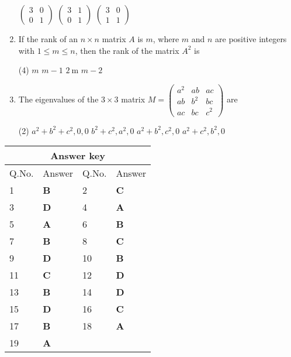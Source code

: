 \begin{enumerate}[label=\color{ocre}\textbf{\arabic*.}]
\begin{tasks}
		\task[\textbf{B.}] $\left(\begin{array}{ll}3 & 0 \\ 0 & 1\end{array}\right)$
		\task[\textbf{C.}] $\left(\begin{array}{ll}3 & 1 \\ 0 & 1\end{array}\right)$
		\task[\textbf{D.}] $\left(\begin{array}{ll}3 & 0 \\ 1 & 1\end{array}\right)$
	\end{tasks}
	\item  If the rank of an $n \times n$ matrix $A$ is $m$, where $m$ and $n$ are positive integers with $1 \leq m \leq n$, then the rank of the matrix $A^{2}$ is
	{}
	\begin{tasks}(4)
		\task[\textbf{A.}]  $m$
		\task[\textbf{B.}] $m-1$
		\task[\textbf{C.}] $2 \mathrm{~m}$
		\task[\textbf{D.}] $m-2$
	\end{tasks}
	\item   The eigenvalues of the $3 \times 3$ matrix $M=\left(\begin{array}{lll}a^{2} & a b & a c \\ a b & b^{2} & b c \\ a c & b c & c^{2}\end{array}\right)$ are
	{}
	\begin{tasks}(2)
		\task[\textbf{A.}] $a^{2}+b^{2}+c^{2}, 0,0$
		\task[\textbf{B.}] $b^{2}+c^{2}, a^{2}, 0$
		\task[\textbf{C.}] $a^{2}+b^{2}, c^{2}, 0$
		\task[\textbf{D.}] $a^{2}+c^{2}, b^{2}, 0$
	\end{tasks}
\end{enumerate}
\setlength\arrayrulewidth{1pt}
\begin{table}[H]
	\centering
	\begin{tabular}{|p{1.5cm}|p{1.5cm}||p{1.5cm}|p{1.5cm}|}
		\hline
		\multicolumn{4}{|c|}{\textbf{Answer key}}\\\hline\hline
		\rowcolor{ocrel}Q.No.&Answer&Q.No.&Answer\\\hline
		1&\textbf{B} &2&\textbf{C}\\\hline 
		3&\textbf{D} &4&\textbf{A} \\\hline
		5&\textbf{A} &6&\textbf{B} \\\hline
		7&\textbf{B}&8&\textbf{C}\\\hline
		9&\textbf{D}&10&\textbf{B}\\\hline
		11&\textbf{C} &12&\textbf{D}\\\hline
		13&\textbf{B}&14&\textbf{D}\\\hline
		15&\textbf{D}&16&\textbf{C}\\\hline
		17&\textbf{B} &18&\textbf{A}\\\hline
		19&\textbf{A}& & \\\hline
	\end{tabular}
\end{table}

